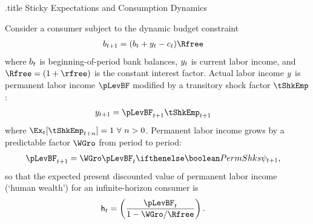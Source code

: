 \documentclass{handout}
\begin{document}
\handoutHeader

\begin{verbatimwrite}{\jobname.title}
Sticky Expectations and Consumption Dynamics
\end{verbatimwrite}

\handoutNameMake

Consider a consumer subject to the dynamic budget constraint
\begin{equation}\begin{gathered}\begin{aligned}
        \bLev_{t+1} & =  (\bLev_{t}+\yLev_{t}-\cLev_{t})\Rfree
\end{aligned}\end{gathered}\end{equation}
where $b_{t}$ is beginning-of-period bank balances,
$y_{t}$ is current labor income, and $\Rfree=(1+\rfree)$ is the constant
interest factor.  Actual labor income $y$ is permanent labor income $\pLevBF$ modified by a 
transitory shock factor $\tShkEmp$:
\begin{equation}\begin{gathered}\begin{aligned}
  \yLev_{t+1} & =  \pLevBF_{t+1} \tShkEmp_{t+1}
\end{aligned}\end{gathered}\end{equation}
where $\Ex_{t}[\tShkEmp_{t+n}]=1~\forall~n>0$.  Permanent labor income grows by a 
predictable factor $\WGro$ from period to period:
\begin{equation}\begin{gathered}\begin{aligned}
  \pLevBF_{t+1} & =  \WGro \pLevBF_{t}\ifPerm{\psi_{t+1}}{},
\end{aligned}\end{gathered}\end{equation}
so that the expected present discounted value of permanent labor income (`human
wealth') for an infinite-horizon consumer is
\begin{equation}\begin{gathered}\begin{aligned}
  \hLev_{t} & =  \left(\frac{\pLevBF_{t}}{1-\WGro/\Rfree}\right).
\end{aligned}\end{gathered}\end{equation}
\end{document}
